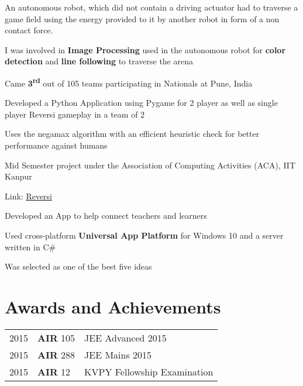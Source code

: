 \documentclass[]{deedy-resume-openfont}
\begin{document}
\begin{minipage}[t]{0.66\textwidth}
\begin{tightemize}
  \item An autonomous robot, which did not contain a driving actuator had to
    traverse a game field using the energy provided to it by another robot in
    form of a non contact force.
  \item I was involved in \textbf{Image Processing} used in the autonomous
    robot for \textbf{color detection} and \textbf{line following} to traverse the arena
  \item Came \textbf{3\textsuperscript{rd}} out of 105 teams participating in Nationals at Pune, India
\end{tightemize}

\begin{tightemize}
  \item Developed a Python Application using Pygame for 2 player as well as
    single player Reversi gameplay in a team of 2
  \item Uses the negamax algorithm with an efficient heuristic check
    for better performance against humans
  \item Mid Semester project under the Association of Computing Activities (ACA), IIT Kanpur
  \item Link: \href{http://github.com/yashsriv/Reversi-Python}{Reversi}
\end{tightemize}

\begin{tightemize}
  \item Developed an App to help connect teachers and learners
  \item Used cross-platform \textbf{Universal App Platform} for Windows 10
    and a server written in C\#
  \item Was selected as one of the best five ideas
\end{tightemize}


\section{Awards and Achievements} 
\begin{tabular}{rll}
  2015	   & \textbf{AIR} 105 & JEE Advanced 2015\\
  2015	   & \textbf{AIR} 288 & JEE Mains 2015\\
  2015	   & \textbf{AIR} 12  & KVPY Fellowship Examination\\
\end{tabular}


\end{minipage}
\end{document}
